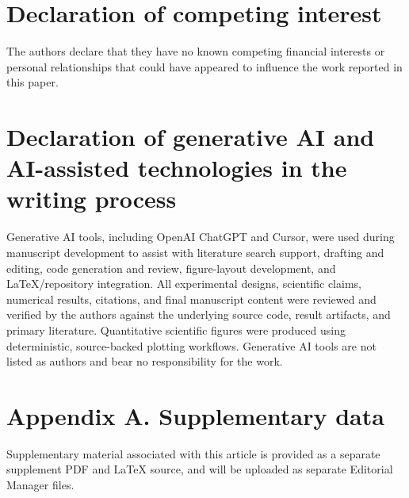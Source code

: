 \documentclass[preprint,12pt,authoryear]{elsarticle}
\begin{document}
\section*{Declaration of competing interest}
The authors declare that they have no known competing financial interests or personal relationships that could have appeared to influence the work reported in this paper.

\section*{Declaration of generative AI and AI-assisted technologies in the writing process}
Generative AI tools, including OpenAI ChatGPT and Cursor, were used during manuscript development to assist with literature search support, drafting and editing, code generation and review, figure-layout development, and LaTeX/repository integration. All experimental designs, scientific claims, numerical results, citations, and final manuscript content were reviewed and verified by the authors against the underlying source code, result artifacts, and primary literature. Quantitative scientific figures were produced using deterministic, source-backed plotting workflows. Generative AI tools are not listed as authors and bear no responsibility for the work.




\section*{Appendix A. Supplementary data}
Supplementary material associated with this article is provided as a separate
supplement PDF and LaTeX source, and will be uploaded as separate Editorial
Manager files.
\end{document}
